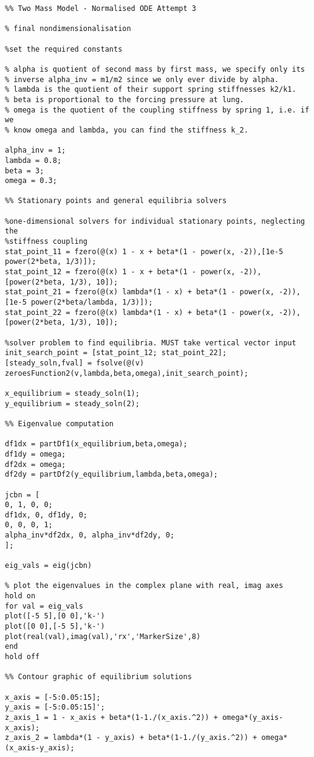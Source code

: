 \documentclass{report}
\begin{document}
\begin{verbatim}
%% Two Mass Model - Normalised ODE Attempt 3

% final nondimensionalisation

%set the required constants

% alpha is quotient of second mass by first mass, we specify only its
% inverse alpha_inv = m1/m2 since we only ever divide by alpha.
% lambda is the quotient of their support spring stiffnesses k2/k1.
% beta is proportional to the forcing pressure at lung.
% omega is the quotient of the coupling stiffness by spring 1, i.e. if we
% know omega and lambda, you can find the stiffness k_2.

alpha_inv = 1;
lambda = 0.8;
beta = 3;
omega = 0.3;

%% Stationary points and general equilibria solvers

%one-dimensional solvers for individual stationary points, neglecting the
%stiffness coupling
stat_point_11 = fzero(@(x) 1 - x + beta*(1 - power(x, -2)),[1e-5 power(2*beta, 1/3)]);
stat_point_12 = fzero(@(x) 1 - x + beta*(1 - power(x, -2)),[power(2*beta, 1/3), 10]);
stat_point_21 = fzero(@(x) lambda*(1 - x) + beta*(1 - power(x, -2)),[1e-5 power(2*beta/lambda, 1/3)]); 
stat_point_22 = fzero(@(x) lambda*(1 - x) + beta*(1 - power(x, -2)),[power(2*beta, 1/3), 10]);

%solver problem to find equilibria. MUST take vertical vector input
init_search_point = [stat_point_12; stat_point_22];
[steady_soln,fval] = fsolve(@(v) zeroesFunction2(v,lambda,beta,omega),init_search_point);

x_equilibrium = steady_soln(1);
y_equilibrium = steady_soln(2);

%% Eigenvalue computation

df1dx = partDf1(x_equilibrium,beta,omega);
df1dy = omega;
df2dx = omega;
df2dy = partDf2(y_equilibrium,lambda,beta,omega);

jcbn = [
0, 1, 0, 0;
df1dx, 0, df1dy, 0;
0, 0, 0, 1;
alpha_inv*df2dx, 0, alpha_inv*df2dy, 0;
];

eig_vals = eig(jcbn)

% plot the eigenvalues in the complex plane with real, imag axes
hold on
for val = eig_vals
plot([-5 5],[0 0],'k-')
plot([0 0],[-5 5],'k-')
plot(real(val),imag(val),'rx','MarkerSize',8)
end
hold off

%% Contour graphic of equilibrium solutions

x_axis = [-5:0.05:15];
y_axis = [-5:0.05:15]';
z_axis_1 = 1 - x_axis + beta*(1-1./(x_axis.^2)) + omega*(y_axis-x_axis);
z_axis_2 = lambda*(1 - y_axis) + beta*(1-1./(y_axis.^2)) + omega*(x_axis-y_axis);


\end{verbatim}
\end{document}
